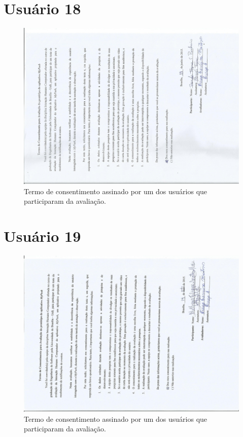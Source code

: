 \begin{anexosenv}
    \section*{Usuário 18}
    \begin{figure}[!htbp]
      \centering
      \includegraphics[scale=0.6, angle=-90]{editaveis/figuras/brenda}
      \caption{Termo de consentimento assinado por um dos usuários que participaram da avaliação.}
      \label{termo_consentimento_1}
    \end{figure}
    \pagebreak
    
    \section*{Usuário 19}
    \begin{figure}[!htbp]
      \centering
      \includegraphics[scale=0.6, angle=-90]{editaveis/figuras/matheus_filippe}
      \caption{Termo de consentimento assinado por um dos usuários que participaram da avaliação.}
      \label{termo_consentimento_1}
    \end{figure}
    \pagebreak
    

\end{anexosenv}
